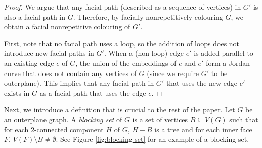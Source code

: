 \documentclass{patmorin}
\begin{document}
\begin{proof}
   We argue that any facial path (described as a sequence of vertices)
   in $G'$ is also a facial path in $G$.  Therefore, by facially
   nonrepetitively colouring $G$, we obtain a facial nonrepetitive
   colouring of $G'$.

   First, note that no facial path uses a loop, so the addition of loops
   does not introduce new facial paths in $G'$.  When a (non-loop) edge
   $e'$ is added parallel to an existing edge $e$ of $G$, the union
   of the embeddings of $e$ and $e'$ form a Jordan curve that does not
   contain any vertices of $G$ (since we require $G'$ to be outerplane).
   This implies that any facial path in $G'$ that uses the new edge $e'$
   exists in $G$ as a facial path that uses the edge $e$.
\end{proof}

Next, we introduce a definition that is crucial to the rest of the paper.
Let $G$ be an outerplane graph. A \emph{blocking set} of $G$ is a set
of vertices $B \subseteq V(G)$ such that for each 2-connected component
$H$ of $G$, $H-B$ is a tree and for each inner face $F$,
$V(F) \setminus B \ne \emptyset$.  See Figure \ref{fig:blocking-set}
for an example of a blocking set.
\end{document}
